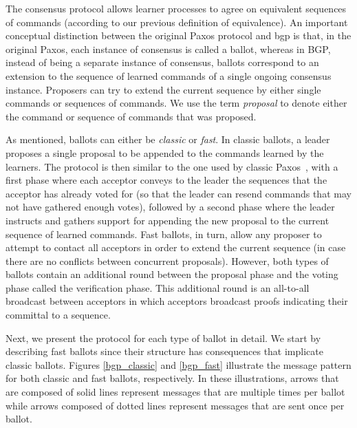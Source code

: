The consensus protocol allows learner processes to agree on equivalent sequences of commands (according to our previous definition of equivalence). An important conceptual distinction between the original Paxos protocol and \acrshort{bgp} is that, in the original Paxos, each instance of consensus is called a ballot, whereas in BGP, instead of being a separate instance of consensus, ballots correspond to an extension to the sequence of learned commands of a single ongoing consensus instance. Proposers can try to extend the current sequence by either single commands or sequences of commands. We use the term \textit{proposal} to denote either the command or sequence of commands that was proposed.\par
As mentioned, ballots can either be \textit{classic} or \textit{fast}. In classic ballots, a leader proposes a single proposal to be appended to the commands learned by the learners. The protocol is then similar to the one used by classic Paxos~\cite{Lam98}, with a first phase where each acceptor conveys to the leader the sequences that the acceptor has already voted for (so that the leader can resend commands that may not have gathered enough votes), followed by a second phase where the leader instructs and gathers support for appending the new proposal to the current sequence of learned commands. Fast ballots, in turn, allow any proposer to attempt to contact all acceptors in order to extend the current sequence (in case there are no conflicts between concurrent proposals). However, both types of ballots contain an additional round between the proposal phase and the voting phase called the verification phase. This additional round is an all-to-all broadcast between acceptors in which acceptors broadcast proofs indicating their committal to a sequence.\par
Next, we present the protocol for each type of ballot in detail. We start by describing fast ballots since their structure has consequences that implicate classic ballots. {\color{red} Figures \ref{bgp_classic} and \ref{bgp_fast} illustrate the message pattern for both classic and fast ballots, respectively. In these illustrations, arrows that are composed of solid lines represent messages that are multiple times per ballot while arrows composed of dotted lines represent messages that are sent once per ballot.}

